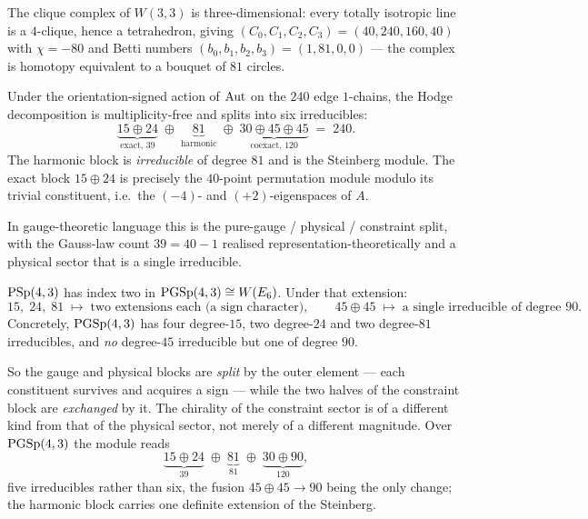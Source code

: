 The clique complex of $W(3,3)$ is three-dimensional: every totally isotropic line
is a $4$-clique, hence a tetrahedron, giving
$(C_0,C_1,C_2,C_3)=(40,240,160,40)$ with $\chi=-80$ and Betti numbers
$(b_0,b_1,b_2,b_3)=(1,81,0,0)$ --- the complex is homotopy equivalent to a
bouquet of $81$ circles.

\begin{theorem}\label{thm:hodgeblocks}
Under the orientation-signed action of $\mathrm{Aut}$ on the $240$ edge $1$-chains, the
Hodge decomposition is multiplicity-free and splits into six irreducibles:
\[
\underbrace{15\oplus 24}_{\text{exact, }39}\;\oplus\;
\underbrace{81}_{\text{harmonic}}\;\oplus\;
\underbrace{30\oplus 45\oplus 45}_{\text{coexact, }120}\;=\;240 .
\]
The harmonic block is \emph{irreducible} of degree $81$ and is the Steinberg
module. The exact block $15\oplus24$ is precisely the $40$-point permutation
module modulo its trivial constituent, i.e.\ the $(-4)$- and $(+2)$-eigenspaces
of $A$.
\end{theorem}

In gauge-theoretic language this is the pure-gauge / physical / constraint split,
with the Gauss-law count $39=40-1$ realised representation-theoretically and a
physical sector that is a single irreducible.

\begin{proposition}
\label{prop:blockchirality}
$\mathrm{PSp}(4,3)$ has index two in $\mathrm{PGSp}(4,3)\cong W(E_6)$. Under that extension:
\[
15,\;24,\;81 \;\longmapsto\; \text{two extensions each (a sign character)},
\qquad
45\oplus45 \;\longmapsto\; \text{a single irreducible of degree } 90 .
\]
Concretely, $\mathrm{PGSp}(4,3)$ has four degree-$15$, two degree-$24$ and two
degree-$81$ irreducibles, and \emph{no} degree-$45$ irreducible but one of degree
$90$.
\end{proposition}

So the gauge and physical blocks are \emph{split} by the outer element --- each
constituent survives and acquires a sign --- while the two halves of the
constraint block are \emph{exchanged} by it. The chirality of the constraint
sector is of a different kind from that of the physical sector, not merely of a
different magnitude. Over $\mathrm{PGSp}(4,3)$ the module reads
\[
  \underbrace{15\oplus24}_{39}\;\oplus\;\underbrace{81}_{81}\;\oplus\;
  \underbrace{30\oplus90}_{120},
\]
five irreducibles rather than six, the fusion $45\oplus45\to90$ being the only
change; the harmonic block carries one definite extension of the Steinberg.

